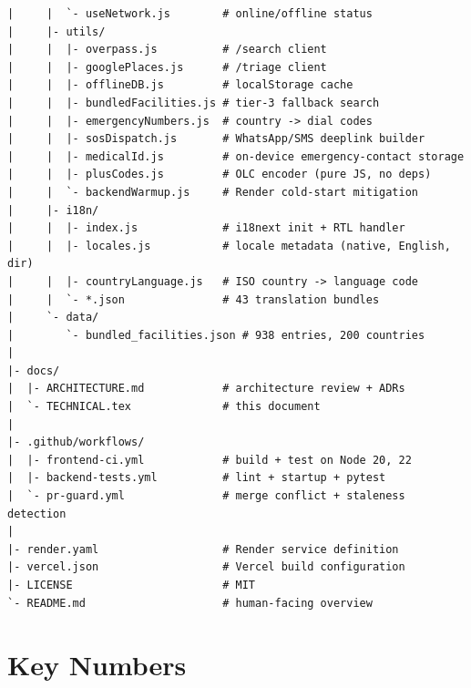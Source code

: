 \documentclass[11pt, a4paper]{article}
\begin{document}
\begin{lstlisting}[language={},numbers=none,frame=none]
|     |  `- useNetwork.js        # online/offline status
|     |- utils/
|     |  |- overpass.js          # /search client
|     |  |- googlePlaces.js      # /triage client
|     |  |- offlineDB.js         # localStorage cache
|     |  |- bundledFacilities.js # tier-3 fallback search
|     |  |- emergencyNumbers.js  # country -> dial codes
|     |  |- sosDispatch.js       # WhatsApp/SMS deeplink builder
|     |  |- medicalId.js         # on-device emergency-contact storage
|     |  |- plusCodes.js         # OLC encoder (pure JS, no deps)
|     |  `- backendWarmup.js     # Render cold-start mitigation
|     |- i18n/
|     |  |- index.js             # i18next init + RTL handler
|     |  |- locales.js           # locale metadata (native, English, dir)
|     |  |- countryLanguage.js   # ISO country -> language code
|     |  `- *.json               # 43 translation bundles
|     `- data/
|        `- bundled_facilities.json # 938 entries, 200 countries
|
|- docs/
|  |- ARCHITECTURE.md            # architecture review + ADRs
|  `- TECHNICAL.tex              # this document
|
|- .github/workflows/
|  |- frontend-ci.yml            # build + test on Node 20, 22
|  |- backend-tests.yml          # lint + startup + pytest
|  `- pr-guard.yml               # merge conflict + staleness detection
|
|- render.yaml                   # Render service definition
|- vercel.json                   # Vercel build configuration
|- LICENSE                       # MIT
`- README.md                     # human-facing overview
\end{lstlisting}

\section{Key Numbers}
\end{document}
